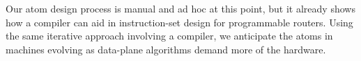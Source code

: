 Our atom design process is manual and ad hoc at this point, but it already
shows how  a compiler can aid in instruction-set design for programmable
routers. Using the same iterative approach involving a compiler, we anticipate
the atoms in \absmachine machines evolving as data-plane algorithms demand more
of the hardware.

